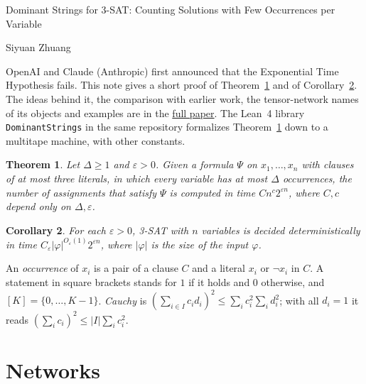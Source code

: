 \documentclass[10pt]{article}
\newtheorem{theorem}{Theorem}
\newtheorem{corollary}[theorem]{Corollary}
\begin{document}
\begin{center}
{\Large Dominant Strings for 3-SAT: Counting Solutions with Few Occurrences per Variable}\par{}\par\smallskip
Siyuan Zhuang\par\smallskip
\small OpenAI and Claude (Anthropic) first announced that the Exponential Time Hypothesis fails. This note gives a short proof of Theorem~\ref{thm:main} and of Corollary~\ref{cor:eth}. The ideas behind it, the comparison with earlier work, the tensor-network names of its objects and examples are in the \href{https://github.com/suquark/NotETHSimplified/blob/main/papers/dominant-strings/paper.pdf}{full paper}. The Lean~4 library \texttt{DominantStrings} in the same repository formalizes Theorem~\ref{thm:main} down to a multitape machine, with other constants.
\end{center}

\begin{theorem}\label{thm:main}
Let $\Delta\ge1$ and $\varepsilon>0$. Given a formula $\Psi$ on $x_1,\dots,x_n$ with clauses of at most three literals, in which every variable has at most $\Delta$ occurrences, the number of assignments that satisfy $\Psi$ is computed in time $Cn^c2^{\varepsilon n}$, where $C,c$ depend only on $\Delta,\varepsilon$.
\end{theorem}

\begin{corollary}\label{cor:eth}
For each $\varepsilon>0$, 3-SAT with $n$ variables is decided deterministically in time $C_\varepsilon|\varphi|^{O_\varepsilon(1)}2^{\varepsilon n}$, where $|\varphi|$ is the size of the input $\varphi$.
\end{corollary}

\noindent An \emph{occurrence} of $x_i$ is a pair of a clause $C$ and a literal $x_i$ or $\neg x_i$ in $C$. A statement in square brackets stands for $1$ if it holds and $0$ otherwise, and $[K]=\{0,\dots,K-1\}$. \emph{Cauchy} is $(\sum_{i\in I}c_id_i)^2\le\sum_ic_i^2\sum_id_i^2$; with all $d_i=1$ it reads $(\sum_ic_i)^2\le|I|\sum_ic_i^2$.

\section{Networks}
\end{document}
